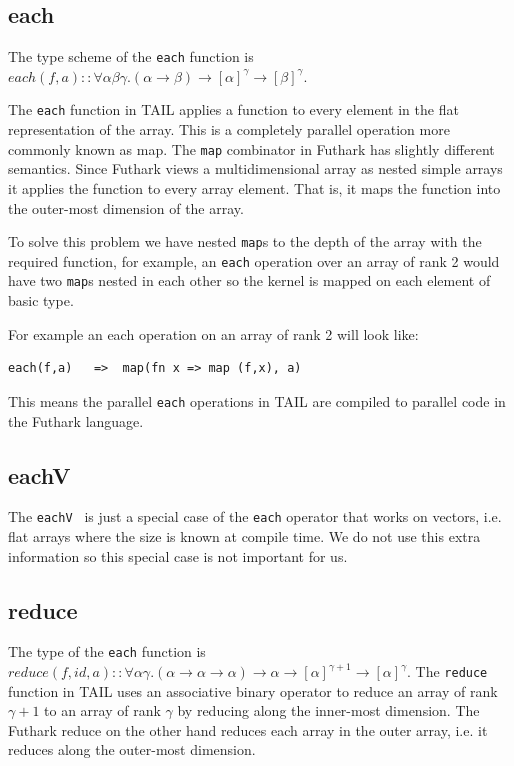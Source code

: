 \documentclass[11pt]{article}
\begin{document}
\subsection{each}

The type scheme of the {\tt each} function is $each(f,a) :: \forall\alpha\beta\gamma.(\alpha \to \beta) \to [\alpha]^\gamma \to [\beta]^\gamma$.

The {\tt each} function in TAIL applies a function to every element in the flat representation of the array.
This is a completely parallel operation more commonly known as map.
The {\tt map} combinator in Futhark has slightly different semantics\cite{ElsmanDybdal:Array:2014}.
Since Futhark views a multidimensional array as nested simple arrays it applies the function to every array element.
That is, it maps the function into the outer-most dimension of the array\cite{TroelsHenriksen}.

To solve this problem we have nested {\tt map}s to the depth of the array with the required function,
for example, an {\tt each} operation over an array of rank 2 would have two {\tt map}s nested in each other so the kernel is
mapped on each element of basic type.

For example an each operation on an array of rank 2 will look like:
\begin{lstlisting}[numbers=none,frame=none]
each(f,a)	=>	map(fn x => map (f,x), a)
\end{lstlisting}

This means the parallel {\tt each} operations in TAIL are compiled to parallel code in the Futhark language.

\subsection{eachV}
The {\tt eachV } is just a special case of the {\tt each} operator that works on vectors, i.e. flat arrays where the size
is known at compile time. We do not use this extra information so this special case is not important for us.

\subsection{reduce}
The type of the {\tt each} function is $reduce(f,id,a) :: \forall\alpha\gamma.(\alpha \to \alpha \to \alpha) \to \alpha \to [\alpha]^{\gamma+1} \to [\alpha]^\gamma$.
The {\tt reduce} function in TAIL uses an associative binary operator to reduce an array of rank
$\gamma+1$ to an array of rank $\gamma$ by reducing along the inner-most dimension\cite{ElsmanDybdal:Array:2014}.
The Futhark reduce on the other hand reduces each array in the outer array, i.e. it reduces along the outer-most dimension\cite{TroelsHenriksen}. 
\end{document}

